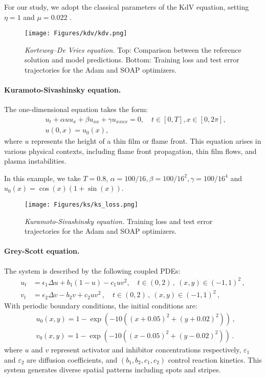 For our study, we adopt the classical parameters of the KdV equation, setting $\eta = 1$ and $\mu = 0.022$ \cite{zabusky1965interaction}.

\begin{figure}
    \centering
    \texttt{[image: Figures/kdv/kdv.png]}
\caption{{\em Korteweg–De Vries equation.}  Top: Comparison between the reference solution and model predictions. Bottom: Training loss and test error trajectories for the Adam and SOAP optimizers.}
    \label{fig:kdv}
\end{figure}


\paragraph{Kuramoto-Sivashinsky equation.} The one-dimensional equation takes the form:
\begin{align*}
    &u_t+\alpha u u_x+\beta u_{x x}+\gamma u_{x x x x}=0, \quad t \in[0,T], x \in[0,2 \pi], \\
    & u(0, x)=u_0(x),
\end{align*}
where $u$ represents the height of a thin film or flame front. This equation arises in various physical contexts, including flame front propagation, thin film flows, and plasma instabilities.


In this example, we take  $T=0.8$, $\alpha=100 / 16, \beta=100 / 16^2, \gamma=100 / 16^4$ and $u_0(x)=\cos (x)(1+\sin (x))$. 


\begin{figure}
    \centering
    \texttt{[image: Figures/ks/ks\_loss.png]}
\caption{{\em Kuramoto-Sivashinsky equation.} Training loss and test error trajectories for the Adam and SOAP optimizers.}
    \label{fig:ks_loss}
\end{figure}



\paragraph{Grey-Scott equation.} The system is described by the following coupled PDEs:
\begin{align*}
    u_t &=\epsilon_1 \Delta u + b_1(1-u) - c_1 u v^2,  \quad t \in (0, 2)\,, \ (x, y) \in (-1, 1)^2\,, \\
    v_t &=\epsilon_2 \Delta v - b_2 v + c_2 u v^2\,, \quad t \in (0, 2)\,, \ (x, y) \in (-1, 1)^2\,,
\end{align*}
With periodic boundary conditions, the initial conditions are:
\begin{align*}
    &u_0(x, y) = 1 - \exp(-10 ((x + 0.05)^2 + (y + 0.02)^2))\,, \\
    &v_0(x, y) = 1 - \exp(-10 ((x - 0.05)^2 + (y - 0.02)^2))\,.
\end{align*}
where $u$ and $v$ represent activator and inhibitor concentrations respectively, $\varepsilon_1$ and $\varepsilon_2$ are diffusion coefficients, and $(b_1, b_2, c_1, c_2)$ control reaction kinetics. This system generates diverse spatial patterns including spots and stripes. 



